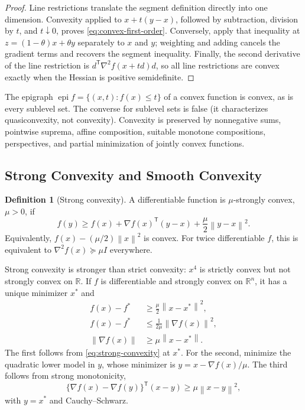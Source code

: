 \documentclass[12pt,oneside]{book}
\numberwithin{equation}{section}
\theoremstyle{definition}
\newtheorem{definition}{Definition}[section]
\theoremstyle{plain}
\theoremstyle{remark}
\newcommand{\R}{\mathbb{R}}
\newcommand{\norm}[1]{\left\lVert #1 \right\rVert}
\newcommand{\grad}{\nabla}
\newcommand{\Hess}{\nabla^2}
\begin{document}
\begin{proof}
Line restrictions translate the segment definition directly into one
dimension. Convexity applied to $x+t(y-x)$, followed by subtraction, division
by $t$, and $t\downarrow0$, proves \cref{eq:convex-first-order}. Conversely,
apply that inequality at $z=(1-\theta)x+\theta y$ separately to $x$ and $y$;
weighting and adding cancels the gradient terms and recovers the segment
inequality. Finally, the second derivative of the line restriction is
$d^\mathsf T\Hess f(x+td)d$, so all line restrictions are convex exactly when
the Hessian is positive semidefinite.
\end{proof}

The epigraph $\operatorname{epi}f=\{(x,t):f(x)\leq t\}$ of a convex function
is convex, as is every sublevel set. The converse for sublevel sets is false
(it characterizes quasiconvexity, not convexity). Convexity is preserved by
nonnegative sums, pointwise suprema, affine composition, suitable monotone
compositions, perspectives, and partial minimization of jointly convex
functions.

\subsection{Strong Convexity and Smooth Convexity}

\begin{definition}[Strong convexity]
A differentiable function is $\mu$-strongly convex, $\mu>0$, if
\begin{equation}
 f(y)\geq f(x)+\grad f(x)^\mathsf T(y-x)
 +\frac\mu2\norm{y-x}^2.
 \label{eq:strong-convexity}
\end{equation}
Equivalently, $f(x)-(\mu/2)\norm x^2$ is convex. For twice differentiable
$f$, this is equivalent to $\Hess f(x)\succeq\mu I$ everywhere.
\end{definition}

Strong convexity is stronger than strict convexity: $x^4$ is strictly convex
but not strongly convex on $\R$. If $f$ is differentiable and strongly convex
on $\R^n$, it has a unique minimizer $x^*$ and
\begin{align}
 f(x)-f^*&\geq\frac\mu2\norm{x-x^*}^2,
 \label{eq:sc-growth}\\
 f(x)-f^*&\leq\frac1{2\mu}\norm{\grad f(x)}^2,
 \label{eq:sc-gradient-gap}\\
 \norm{\grad f(x)}&\geq\mu\norm{x-x^*}.
 \label{eq:sc-gradient-distance}
\end{align}
The first follows from \cref{eq:strong-convexity} at $x^*$. For the second,
minimize the quadratic lower model in $y$, whose minimizer is
$y=x-\grad f(x)/\mu$. The third follows from strong monotonicity,
\[
 \{\grad f(x)-\grad f(y)\}^\mathsf T(x-y)\geq\mu\norm{x-y}^2,
\]
with $y=x^*$ and Cauchy--Schwarz.
\end{document}
